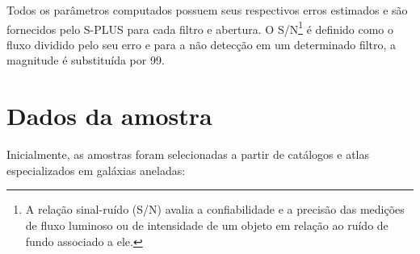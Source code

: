 Todos os parâmetros computados possuem seus respectivos erros estimados e são fornecidos pelo S-PLUS para cada filtro e abertura. O S/N\footnote{A relação sinal-ruído (S/N) avalia a confiabilidade e a precisão das medições de fluxo luminoso ou de intensidade de um objeto em relação ao ruído de fundo associado a ele.} é definido como o fluxo dividido pelo seu erro e para a não detecção em um determinado filtro, a magnitude é substituída por 99.

\section{Dados da amostra}

Inicialmente, as amostras foram selecionadas a partir de catálogos e atlas especializados em galáxias aneladas:


